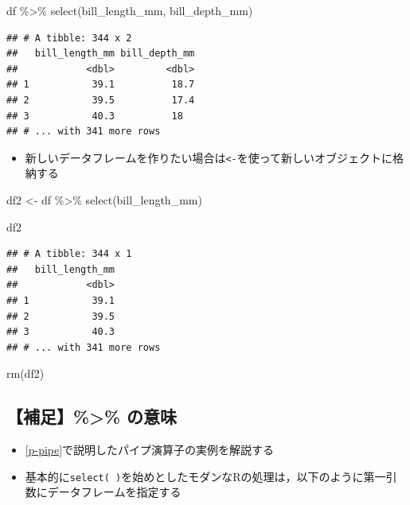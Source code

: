 \documentclass[
  xelatex,ja=standard, b5paper]{bxjsbook}
\newenvironment{Shaded}{\begin{snugshade}}{\end{snugshade}}
\newcommand{\FunctionTok}[1]{\textcolor[rgb]{0.00,0.00,0.00}{#1}}
\newcommand{\NormalTok}[1]{#1}
\newcommand{\OtherTok}[1]{\textcolor[rgb]{0.56,0.35,0.01}{#1}}
\newcommand{\SpecialCharTok}[1]{\textcolor[rgb]{0.00,0.00,0.00}{#1}}
\providecommand{\tightlist}{%
  \setlength{\itemsep}{0pt}\setlength{\parskip}{0pt}}
\begin{document}
\begin{Shaded}
\begin{Highlighting}[]
\NormalTok{df }\SpecialCharTok{\%\textgreater{}\%} 
  \FunctionTok{select}\NormalTok{(bill\_length\_mm, bill\_depth\_mm)}
\end{Highlighting}
\end{Shaded}

\begin{verbatim}
## # A tibble: 344 x 2
##   bill_length_mm bill_depth_mm
##            <dbl>         <dbl>
## 1           39.1          18.7
## 2           39.5          17.4
## 3           40.3          18  
## # ... with 341 more rows
\end{verbatim}

\begin{itemize}
\tightlist
\item
  新しいデータフレームを作りたい場合は\texttt{\textless{}-}を使って新しいオブジェクトに格納する
\end{itemize}

\begin{Shaded}
\begin{Highlighting}[]
\NormalTok{df2 }\OtherTok{\textless{}{-}} 
\NormalTok{  df }\SpecialCharTok{\%\textgreater{}\%} \FunctionTok{select}\NormalTok{(bill\_length\_mm)}

\NormalTok{df2}
\end{Highlighting}
\end{Shaded}

\begin{verbatim}
## # A tibble: 344 x 1
##   bill_length_mm
##            <dbl>
## 1           39.1
## 2           39.5
## 3           40.3
## # ... with 341 more rows
\end{verbatim}

\begin{Shaded}
\begin{Highlighting}[]
\FunctionTok{rm}\NormalTok{(df2)}
\end{Highlighting}
\end{Shaded}

\hypertarget{select-standard-pipe}{%
\subsection{【補足】\%\textgreater\% の意味}\label{select-standard-pipe}}

\begin{itemize}
\tightlist
\item
  \ref{p-pipe}で説明したパイプ演算子の実例を解説する
\item
  基本的に\texttt{select(\ )}を始めとしたモダンなRの処理は，以下のように第一引数にデータフレームを指定する
\end{itemize}
\end{document}
